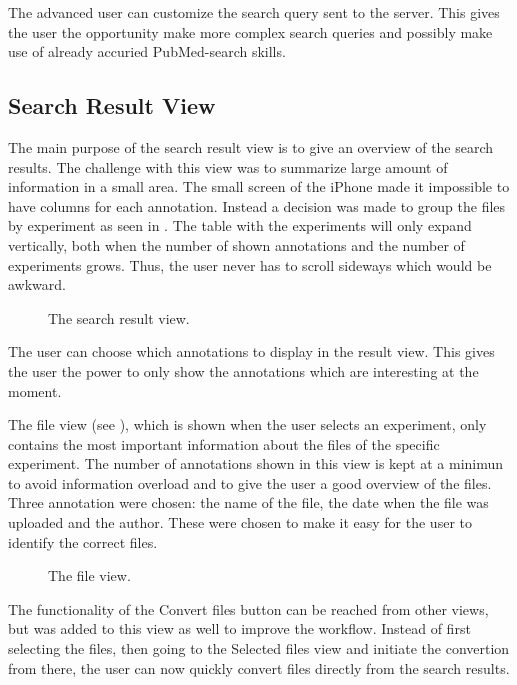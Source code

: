 The advanced user can customize the search query sent to the server. This gives the user the opportunity make more complex search queries and possibly make use of already accuried PubMed-search skills.

\subsection{Search Result View}
The main purpose of the search result view is to give an overview of the search results. The challenge with this view was to summarize large amount of information in a small area. The small screen of the iPhone made it impossible to have columns for each annotation. Instead a decision was made to group the files by experiment as seen in . The table with the experiments will only expand vertically, both when the number of shown annotations and the number of experiments grows. Thus, the user never has to scroll sideways which would be awkward.

\begin{figure}[ht]
\caption{The search result view.}
\label{fig:ios_searchResult2}
\end{figure}
\FloatBarrier

The user can choose which annotations to display in the result view. This gives the user the power to only show the annotations which are interesting at the moment. 

The file view (see ), which is shown when the user selects an experiment, only contains the most important information about the files of the specific experiment. The number of annotations shown in this view is kept at a minimun to avoid information overload and to give the user a good overview of the files. Three annotation were chosen: the name of the file, the date when the file was uploaded and the author. These were chosen to make it easy for the user to identify the correct files.

\begin{figure}[ht]
\caption{The file view.}
\label{fig:ios_files2}
\end{figure}
\FloatBarrier

The functionality of the Convert files button can be reached from other views, but was added to this view as well to improve the workflow. Instead of first selecting the files, then going to the Selected files view and initiate the convertion from there, the user can now quickly convert files directly from the search results.


